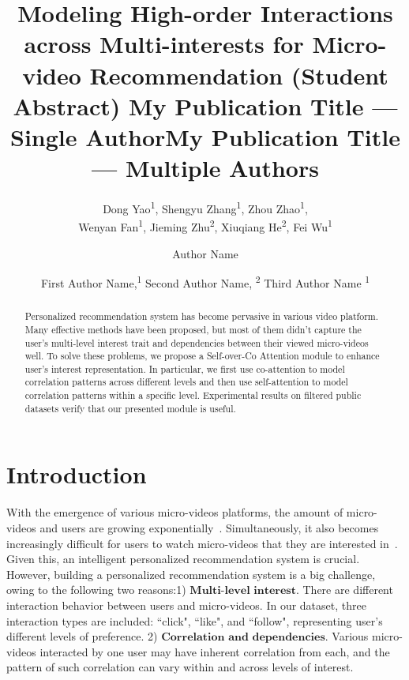 \documentclass[letterpaper]{article} %
\title{Modeling High-order Interactions across Multi-interests for Micro-video Recommendation (Student Abstract) }
\author{
    Dong Yao\textsuperscript{\rm 1},
    Shengyu Zhang\textsuperscript{\rm 1},
    Zhou Zhao\textsuperscript{\rm 1},  \\
    Wenyan Fan\textsuperscript{\rm 1},
    Jieming Zhu\textsuperscript{\rm 2},
    Xiuqiang He\textsuperscript{\rm 2},
    Fei Wu\textsuperscript{\rm 1}
    \\
}
\title{My Publication Title --- Single Author}
\author {
    Author Name \\
}
\title{My Publication Title --- Multiple Authors}
\author {
    First Author Name,\textsuperscript{\rm 1}
    Second Author Name, \textsuperscript{\rm 2}
    Third Author Name \textsuperscript{\rm 1} \\
}
\begin{document}
	
	\maketitle
	
	\begin{abstract}
		Personalized recommendation system has become pervasive in various video platform. Many effective methods have been proposed, but most of them didn't capture the user's multi-level interest trait and dependencies between their viewed micro-videos well. To solve these problems, we propose a Self-over-Co Attention module to enhance user's interest representation. In particular, we first use co-attention to model correlation patterns across different levels and then use self-attention to model correlation patterns within a specific level. Experimental results on filtered public datasets verify that our presented module is useful.  
	\end{abstract}
	
	
	
	\section{Introduction}
	With the emergence of various micro-videos platforms, the amount of micro-videos and users are growing exponentially~\cite{titling}. Simultaneously, it also becomes increasingly difficult for users to watch micro-videos that they are interested in~\cite{poet}. Given this, an intelligent personalized recommendation system is crucial. However, building a personalized recommendation system is a big challenge, owing to the following two reasons:1) $\textbf{Multi-level interest}$. There are different interaction behavior between users and micro-videos. In our dataset, three interaction types are included: ``click", ``like", and ``follow", representing user's different levels of preference. 2) $\textbf{Correlation and dependencies}$. Various micro-videos interacted by one user may have inherent correlation from each, and the pattern of such correlation can vary within and across levels of interest.
	
\end{document}
